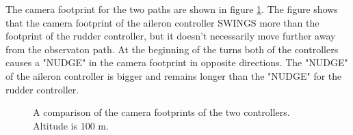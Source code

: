 The camera footprint for the two paths are shown in figure \ref{fig:ratc_aotc_comparison}. The figure shows that the camera footprint of the aileron controller SWINGS more than the footprint of the rudder controller, but it doesn't necessarily move further away from the observaton path. At the beginning of the turns both of the controllers causes a "NUDGE" in the camera footprint in opposite directions. The "NUDGE" of the aileron controller is bigger and remains longer than the "NUDGE" for the rudder controller.

\begin{figure}[]
    \centering
    \caption{A comparison of the camera footprints of the two controllers. Altitude is $100$ m.}
	\label{fig:ratc_aotc_comparison}
\end{figure}
